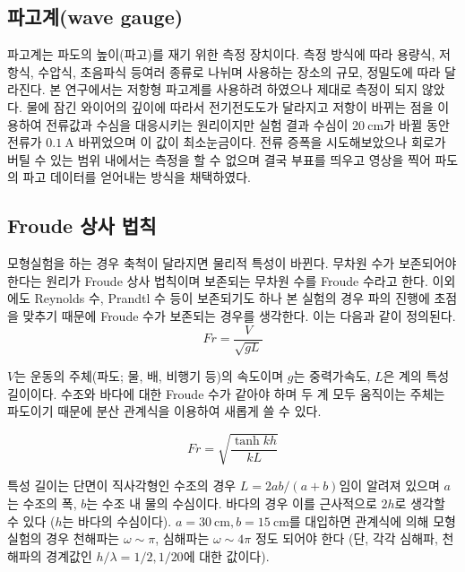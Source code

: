 \subsection{파고계(wave gauge)}

파고계는 파도의 높이(파고)를 재기 위한 측정 장치이다. 측정 방식에 따라 용량식, 저항식, 수압식, 초음파식 등여러 종류로 나뉘며 사용하는 장소의 규모, 정밀도에 따라 달라진다. 본 연구에서는 저항형 파고계를 사용하려 하였으나 제대로 측정이 되지 않았다. 물에 잠긴 와이어의 깊이에 따라서 전기전도도가 달라지고 저항이 바뀌는 점을 이용하여 전류값과 수심을 대응시키는 원리이지만 실험 결과 수심이 $20\mathrm{~cm}$가 바뀔 동안 전류가 $0.1\mathrm{~A}$ 바뀌었으며 이 값이 최소눈금이다. 전류 증폭을 시도해보았으나 회로가 버틸 수 있는 범위 내에서는 측정을 할 수 없으며 결국 부표를 띄우고 영상을 찍어 파도의 파고 데이터를 얻어내는 방식을 채택하였다.

\subsection{Froude 상사 법칙}
모형실험을 하는 경우 축척이 달라지면 물리적 특성이 바뀐다. 무차원 수가 보존되어야 한다는 원리가 Froude 상사 법칙이며 보존되는 무차원 수를 Froude 수라고 한다.\cite{briggs2013basics, chakrabarti1994offshore} 이외에도 Reynolds 수, Prandtl 수 등이 보존되기도 하나 본 실험의 경우 파의 진행에 초점을 맞추기 때문에 Froude 수가 보존되는 경우를 생각한다. 이는 다음과 같이 정의된다.
\begin{equation}
    Fr = \frac{V}{\sqrt{gL}}
\end{equation}

$V$는 운동의 주체(파도; 물, 배, 비행기 등)의 속도이며 $g$는 중력가속도, $L$은 계의 특성길이이다. 수조와 바다에 대한 Froude 수가 같아야 하며 두 계 모두 움직이는 주체는 파도이기 때문에 분산 관계식을 이용하여 새롭게 쓸 수 있다.

\begin{equation}
    Fr = \sqrt{\frac{\tanh{kh}}{kL}}
\end{equation}

특성 길이는 단면이 직사각형인 수조의 경우 $L = {2ab}/{(a+b)}$임이 알려져 있으며 $a$는 수조의 폭, $b$는 수조 내 물의 수심이다. 바다의 경우 이를 근사적으로 $2h$로 생각할 수 있다 ($h$는 바다의 수심이다). $a=30\mathrm{~cm}, b=15\mathrm{~cm}$를 대입하면 관계식에 의해 모형 실험의 경우 천해파는 $\omega \sim \pi$, 심해파는 $\omega \sim 4\pi$ 정도 되어야 한다 (단, 각각 심해파, 천해파의 경계값인 $h/\lambda = 1/2, 1/20$에 대한 값이다).


